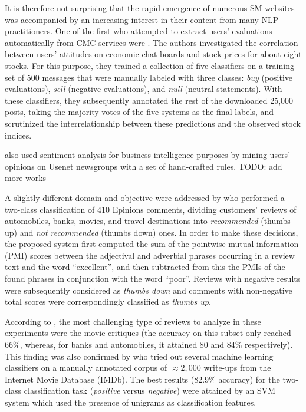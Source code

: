It is therefore not surprising that the rapid emergence of numerous SM
websites was accompanied by an increasing interest in their content
from many NLP practitioners.  One of the first who attempted to
extract users' evaluations automatically from CMC services were
\citet{Das:01}.  The authors investigated the correlation between
users' attitudes on economic chat boards and stock prices for about
eight stocks.  For this purpose, they trained a collection of five
classifiers on a training set of 500 messages that were manually
labeled with three classes: \emph{buy} (positive evaluations),
\emph{sell} (negative evaluations), and \emph{null} (neutral
statements).  With these classifiers, they subsequently annotated the
rest of the downloaded 25,000 posts, taking the majority votes of the
five systems as the final labels, and scrutinized the
interrelationship between these predictions and the observed stock
indices.

\citet{Glance:05} also used sentiment analysis for business
intelligence purposes by mining users' opinions on Usenet newsgroups
with a set of hand-crafted rules. TODO: add more works

A slightly different domain and objective were addressed by
\citet{Turney:02} who performed a two-class classification of 410
Epinions comments, dividing customers' reviews of automobiles, banks,
movies, and travel destinations into \emph{recommended} (thumbs up)
and \emph{not recommended} (thumbs down) ones.  In order to make these
decisions, the proposed system first computed the sum of the pointwise
mutual information (PMI) scores between the adjectival and adverbial
phrases occurring in a review text and the word ``excellent'', and
then subtracted from this the PMIs of the found phrases in conjunction
with the word ``poor''.  Reviews with negative results were
subsequently considered as \emph{thumbs down} and comments with
non-negative total scores were correspondingly classified as
\emph{thumbs up}.

According to \citet{Turney:02}, the most challenging type of reviews
to analyze in these experiments were the movie critiques (the accuracy
on this subset only reached 66\%, whereas, for banks and automobiles,
it attained 80 and 84\% respectively).  This finding was also
confirmed by \citet{Pang:02} who tried out several machine learning
classifiers on a manually annotated corpus of $\approx2,000$ write-ups
from the Internet Movie Database (IMDb).  The best results (82.9\%
accuracy) for the two-class classification task (\emph{positive}
versus \emph{negative}) were attained by an SVM system which used the
presence of unigrams as classification features.

